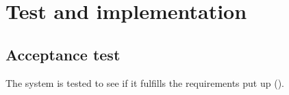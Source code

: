 \part{ Test and implementation}
\chapter{Acceptance test}\label{chap:acceptanceTest}
The system is tested to see if it fulfills the requirements put up ().

